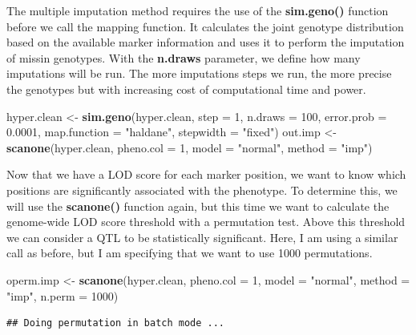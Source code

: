 \documentclass[12pt,]{book}
\newenvironment{Shaded}{\begin{snugshade}}{\end{snugshade}}
\newcommand{\KeywordTok}[1]{\textcolor[rgb]{0.13,0.29,0.53}{\textbf{{#1}}}}
\newcommand{\DataTypeTok}[1]{\textcolor[rgb]{0.13,0.29,0.53}{{#1}}}
\newcommand{\DecValTok}[1]{\textcolor[rgb]{0.00,0.00,0.81}{{#1}}}
\newcommand{\FloatTok}[1]{\textcolor[rgb]{0.00,0.00,0.81}{{#1}}}
\newcommand{\StringTok}[1]{\textcolor[rgb]{0.31,0.60,0.02}{{#1}}}
\newcommand{\NormalTok}[1]{{#1}}
\theoremstyle{definition}
\theoremstyle{definition}
\theoremstyle{remark}
\begin{document}
The multiple imputation method requires the use of the
\textbf{sim.geno()} function before we call the mapping function. It
calculates the joint genotype distribution based on the available marker
information and uses it to perform the imputation of missin genotypes.
With the \textbf{n.draws} parameter, we define how many imputations will
be run. The more imputations steps we run, the more precise the
genotypes but with increasing cost of computational time and power.

\begin{Shaded}
\begin{Highlighting}[]
\NormalTok{hyper.clean <-}\StringTok{ }\KeywordTok{sim.geno}\NormalTok{(hyper.clean, }\DataTypeTok{step =} \DecValTok{1}\NormalTok{, }\DataTypeTok{n.draws =} \DecValTok{100}\NormalTok{, }
			\DataTypeTok{error.prob =} \FloatTok{0.0001}\NormalTok{, }\DataTypeTok{map.function =} \StringTok{"haldane"}\NormalTok{, }
			\DataTypeTok{stepwidth =} \StringTok{"fixed"}\NormalTok{)}
\NormalTok{out.imp <-}\StringTok{ }\KeywordTok{scanone}\NormalTok{(hyper.clean, }\DataTypeTok{pheno.col =} \DecValTok{1}\NormalTok{, }\DataTypeTok{model =} \StringTok{"normal"}\NormalTok{, }
		   \DataTypeTok{method =} \StringTok{"imp"}\NormalTok{)}
\end{Highlighting}
\end{Shaded}

Now that we have a LOD score for each marker position, we want to know
which positions are significantly associated with the phenotype. To
determine this, we will use the \textbf{scanone()} function again, but
this time we want to calculate the genome-wide LOD score threshold with
a permutation test. Above this threshold we can consider a QTL to be
statistically significant. Here, I am using a similar call as before,
but I am specifying that we want to use 1000 permutations.

\begin{Shaded}
\begin{Highlighting}[]
\NormalTok{operm.imp <-}\StringTok{ }\KeywordTok{scanone}\NormalTok{(hyper.clean, }\DataTypeTok{pheno.col =} \DecValTok{1}\NormalTok{, }\DataTypeTok{model =} \StringTok{"normal"}\NormalTok{, }
			\DataTypeTok{method =} \StringTok{"imp"}\NormalTok{, }\DataTypeTok{n.perm =} \DecValTok{1000}\NormalTok{)}
\end{Highlighting}
\end{Shaded}

\begin{verbatim}
## Doing permutation in batch mode ...
\end{verbatim}
\end{document}
